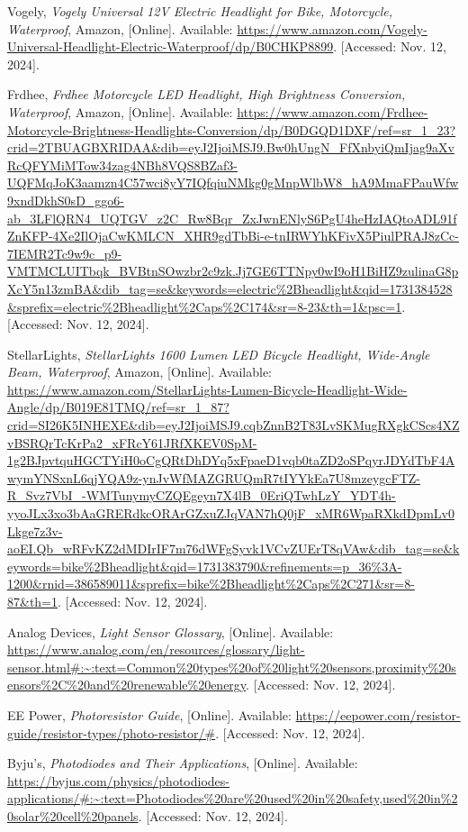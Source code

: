 \begin{thebibliography}{45}
	Vogely, \textit{Vogely Universal 12V Electric Headlight for Bike, Motorcycle, Waterproof}, Amazon, [Online]. Available: \url{https://www.amazon.com/Vogely-Universal-Headlight-Electric-Waterproof/dp/B0CHKP8899}. [Accessed: Nov. 12, 2024].
	
	Frdhee, \textit{Frdhee Motorcycle LED Headlight, High Brightness Conversion, Waterproof}, Amazon, [Online]. Available: \url{https://www.amazon.com/Frdhee-Motorcycle-Brightness-Headlights-Conversion/dp/B0DGQD1DXF/ref=sr_1_23?crid=2TBUAGBXRIDAA&dib=eyJ2IjoiMSJ9.Bw0hUngN_FfXnbyiQmIjag9aXvRcQFYMiMTow34zag4NBh8VQS8BZaf3-UQFMqJoK3aamzn4C57wci8yY7IQfqiuNMkg0gMnpWlbW8_hA9MmaFPauWfw9xndDkhS0sD_ggo6-ab_3LFlQRN4_UQTGV_z2C_Rw8Bqr_ZxJwnENlyS6PgU4heHzIAQtoADL91fZnKFP-4Xe2IlOjaCwKMLCN_XHR9gdTbBi-e-tnIRWYhKFivX5PiulPRAJ8zCc-7IEMR2Tc9w9c_p9-VMTMCLUITbqk_BVBtnSOwzbr2c9zk.Jj7GE6TTNpy0wI9oH1BiHZ9zulinaG8pXcY5n13zmBA&dib_tag=se&keywords=electric%2Bheadlight&qid=1731384528&sprefix=electric%2Bheadlight%2Caps%2C174&sr=8-23&th=1&psc=1}. [Accessed: Nov. 12, 2024].
	
	StellarLights, \textit{StellarLights 1600 Lumen LED Bicycle Headlight, Wide-Angle Beam, Waterproof}, Amazon, [Online]. Available: \url{https://www.amazon.com/StellarLights-Lumen-Bicycle-Headlight-Wide-Angle/dp/B019E81TMQ/ref=sr_1_87?crid=SI26K5INHEXE&dib=eyJ2IjoiMSJ9.cqbZnnB2T83LvSKMugRXgkCScs4XZvBSRQrTcKrPa2_xFRcY61JRfXKEV0SpM-1g2BJpvtquHGCTYiH0oCgQRtDhDYq5xFpaeD1vqb0taZD2oSPqyrJDYdTbF4AwymYNSxnL6qjYQA9z-ynJvWfMAZGRUQmR7tIYYkEa7U8mzeygcFTZ-R_Svz7VbI_-WMTunymyCZQEgeyn7X4lB_0EriQTwhLzY_YDT4h-yyoJLx3xo3bAaGRERdkcORArGZxuZJqVAN7hQ0jF_xMR6WpaRXkdDpmLv0Lkge7z3v-aoEI.Qb_wRFvKZ2dMDIrIF7m76dWFgSyvk1VCvZUErT8qVAw&dib_tag=se&keywords=bike%2Bheadlight&qid=1731383790&refinements=p_36%3A-1200&rnid=386589011&sprefix=bike%2Bheadlight%2Caps%2C271&sr=8-87&th=1}. [Accessed: Nov. 12, 2024].
	
	Analog Devices, \textit{Light Sensor Glossary}, [Online]. Available: \url{https://www.analog.com/en/resources/glossary/light-sensor.html#:~:text=Common%20types%20of%20light%20sensors,proximity%20sensors%2C%20and%20renewable%20energy}. [Accessed: Nov. 12, 2024].
	
	EE Power, \textit{Photoresistor Guide}, [Online]. Available: \url{https://eepower.com/resistor-guide/resistor-types/photo-resistor/#}. [Accessed: Nov. 12, 2024].
	
	Byju's, \textit{Photodiodes and Their Applications}, [Online]. Available: \url{https://byjus.com/physics/photodiodes-applications/#:~:text=Photodiodes%20are%20used%20in%20safety,used%20in%20solar%20cell%20panels}. [Accessed: Nov. 12, 2024].
	

\end{thebibliography}
